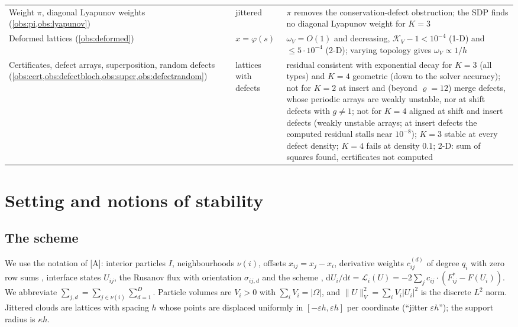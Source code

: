 \documentclass[11pt,a4paper]{article}
\theoremstyle{plain}
\theoremstyle{definition}
\theoremstyle{remark}
\numberwithin{equation}{section}
\newcommand{\dd}{\mathrm{d}}
\newcommand{\nb}{\nu}
\newcommand{\Lop}{\mathcal{L}}
\newcommand{\Fs}{F^{*}}
\newcommand{\A}[1]{\cite[#1]{Addendum}}
\begin{document}
\begin{table}[p]
\begin{tabular}{>{\raggedright}p{4.4cm}>{\raggedright}p{2.6cm}>{\raggedright\arraybackslash}p{8.2cm}}
Weight $\pi$, diagonal Lyapunov weights (\cref{obs:pi,obs:lyapunov}) & jittered & $\pi$ removes the conservation-defect obstruction; the SDP finds no diagonal Lyapunov weight for $K=3$\\
Deformed lattices (\cref{obs:deformed}) & $x=\varphi(s)$ & $\omega_V=O(1)$ and decreasing, $\mathcal K_V-1<10^{-4}$ (1-D) and $\le5\cdot10^{-4}$ (2-D); varying topology gives $\omega_V\propto1/h$\\
Certificates, defect arrays, superposition, random defects (\cref{obs:cert,obs:defectbloch,obs:super,obs:defectrandom}) & lattices with defects & residual consistent with exponential decay for $K=3$ (all types) and $K=4$ geometric (down to the solver accuracy); not for $K=2$ at insert and (beyond $\varrho=12$) merge defects, whose periodic arrays are weakly unstable, nor at shift defects with $g\ne1$; not for $K=4$ aligned at shift and insert defects (weakly unstable arrays; at insert defects the computed residual stalls near $10^{-8}$); $K=3$ stable at every defect density; $K=4$ fails at density $0.1$; 2-D: sum of squares found, certificates not computed\\
\bottomrule
\end{tabular}
\end{table}

\section{Setting and notions of stability}\label{sec:setting}

\subsection{The scheme}

We use the notation of [A]: interior particles $I$, neighbourhoods $\nb(i)$, offsets $x_{ij}=x_j-x_i$, derivative weights $c^{(d)}_{ij}$ of degree $q_i$ with zero row sums \A{Lem.~3.3}, interface states $U_{ij}$, the Rusanov flux \A{(4.3)} with orientation $\sigma_{ij,d}$ and the scheme \A{(4.4)}, $\dd U_i/\dd t=\Lop_i(U)=-2\sum_jc_{ij}\cdot(\Fs_{ij}-F(U_i))$. We abbreviate $\sum_{j,d}=\sum_{j\in\nb(i)}\sum_{d=1}^D$. Particle volumes are $V_i>0$ with $\sum_iV_i=|\Omega|$, and $\|U\|_V^2=\sum_iV_i|U_i|^2$ is the discrete $L^2$ norm. Jittered clouds are lattices with spacing $h$ whose points are displaced uniformly in $[-\varepsilon h,\varepsilon h]$ per coordinate (``jitter $\varepsilon h$''); the support radius is $\kappa h$.
\end{document}
